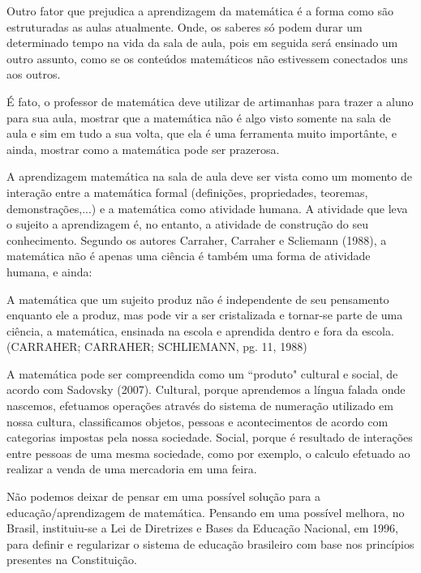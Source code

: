 \documentclass[brasil]{abnt}
\begin{document}
    Outro fator que prejudica a aprendizagem da matemática é a forma como são estruturadas as aulas atualmente. Onde, os saberes só podem durar um determinado tempo na vida da sala de aula, pois em seguida 
    será ensinado um outro assunto, como se os conteúdos matemáticos não estivessem conectados uns aos outros.
   
    É fato, o professor de matemática deve utilizar de artimanhas para trazer a aluno para sua aula, mostrar que a matemática não é algo visto somente na sala de aula e sim em tudo a sua volta, que ela é uma 
    ferramenta muito importânte, e ainda, mostrar como a matemática pode ser prazerosa.
       
    A aprendizagem matemática na sala de aula deve ser vista como um momento de interação entre a matemática formal (definições, propriedades, teoremas, demonstrações,...) e a matemática como atividade humana. 
    A atividade que leva o sujeito a aprendizagem é, no entanto, a atividade de construção do seu conhecimento. Segundo os autores Carraher, Carraher e Scliemann (1988), a matemática não é apenas uma ciência é 
    também uma forma de atividade humana, e ainda: 
    
    \begin{citacao}A matemática que um sujeito produz não é independente de seu pensamento enquanto ele a produz, mas pode vir a ser cristalizada e tornar-se parte de uma 
			ciência, a matemática, ensinada na escola e aprendida dentro e fora da escola. (CARRAHER; CARRAHER; SCHLIEMANN, pg. 11, 1988)
    \end{citacao}
    
    A matemática pode ser compreendida como um “produto" cultural e social, de acordo com Sadovsky (2007). Cultural, porque aprendemos a língua falada onde nascemos, efetuamos operações 
    através do sistema de numeração utilizado em nossa cultura, classificamos objetos, pessoas e acontecimentos de acordo com categorias impostas pela nossa 
    sociedade. Social, porque é resultado de interações entre pessoas de uma mesma sociedade, como por exemplo, o calculo efetuado ao realizar a venda de uma 
    mercadoria em uma feira.
    
    Não podemos deixar de pensar em uma possível solução para a educação/aprendizagem de matemática. Pensando em uma possível melhora, no Brasil, instituiu-se a 
    Lei de Diretrizes e Bases da Educação Nacional, em 1996, para definir e regularizar o sistema de educação brasileiro com base nos princípios presentes na Constituição. 
    
\end{document}
